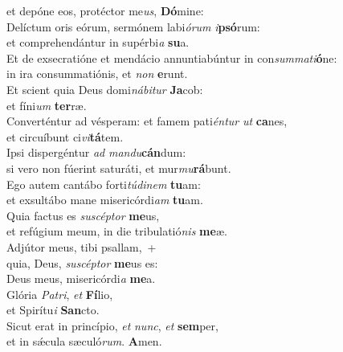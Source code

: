 \evenverse et depóne eos, protéctor me\textit{us}, \textbf{Dó}mine:\\
\oddverse Delíctum oris eórum, sermónem labi\textit{ó}\textit{rum} \textit{i}\textbf{psó}rum:~\*\\
\oddverse et comprehendántur in supérbi\textit{a} \textbf{su}a.\\
\evenverse Et de exsecratióne et mendácio annuntiabúntur in con\textit{sum}\textit{ma}\textit{ti}\textbf{ó}ne:~\*\\
\evenverse in ira consummatiónis, et \textit{non} \textbf{e}runt.\\
\oddverse Et scient quia Deus domi\textit{ná}\textit{bi}\textit{tur} \textbf{Ja}cob:~\*\\
\oddverse et fíni\textit{um} \textbf{ter}ræ.\\
\evenverse Converténtur ad vésperam: et famem pati\textit{én}\textit{tur} \textit{ut} \textbf{ca}nes,~\*\\
\evenverse et circuíbunt ci\textit{vi}\textbf{tá}tem.\\
\oddverse Ipsi dispergéntur \textit{ad} \textit{man}\textit{du}\textbf{cán}dum:~\*\\
\oddverse si vero non fúerint saturáti, et mur\textit{mu}\textbf{rá}bunt.\\
\evenverse Ego autem cantábo forti\textit{tú}\textit{di}\textit{nem} \textbf{tu}am:~\*\\
\evenverse et exsultábo mane misericórdi\textit{am} \textbf{tu}am.\\
\oddverse Quia factus es \textit{su}\textit{scép}\textit{tor} \textbf{me}us,~\*\\
\oddverse et refúgium meum, in die tribulatió\textit{nis} \textbf{me}æ.\\
\evenverse Adjútor meus, tibi psallam,~+\\
\evenverse  quia, Deus, \textit{su}\textit{scép}\textit{tor} \textbf{me}us es:~\*\\
\evenverse Deus meus, misericórdi\textit{a} \textbf{me}a.\\
\oddverse Glória \textit{Pa}\textit{tri}, \textit{et} \textbf{Fí}lio,~\*\\
\oddverse et Spirítu\textit{i} \textbf{San}cto.\\
\evenverse Sicut erat in princípio, \textit{et} \textit{nunc}, \textit{et} \textbf{sem}per,~\*\\
\evenverse et in sǽcula sæculó\textit{rum}. \textbf{A}men.\\
